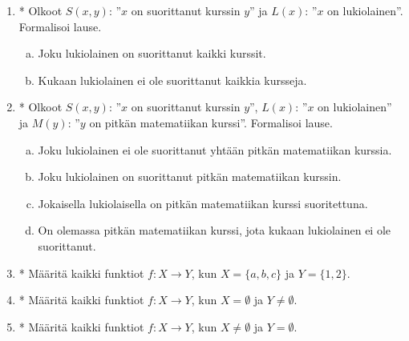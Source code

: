 \begin{enumerate}
\item * %
 Olkoot $S(x, y)$: ''$x$ on suorittanut
kurssin $y$'' ja $L(x)$: ''$x$ on lukiolainen''. Formalisoi lause.
\begin{enumerate}[a)]
\item Joku lukiolainen on suorittanut kaikki kurssit.
\item Kukaan lukiolainen ei ole suorittanut kaikkia kursseja.
\end{enumerate}

\item * %
Olkoot $S(x, y)$: ''$x$ on suorittanut
kurssin $y$'', $L(x)$: ''$x$ on lukiolainen'' ja $M(y)$: ''$y$ on
pitkän matematiikan kurssi''. Formalisoi lause.
\begin{enumerate}[a)]
\item Joku lukiolainen ei ole suorittanut yhtään pitkän
matematiikan kurssia.
\item Joku lukiolainen on suorittanut pitkän matematiikan
kurssin.
\item Jokaisella lukiolaisella on pitkän matematiikan kurssi
suoritettuna.
\item On olemassa pitkän matematiikan kurssi, jota kukaan
lukiolainen ei ole suorittanut.
\end{enumerate}

\item * %
Määritä kaikki funktiot $f\colon X\to Y$,
kun $X=\{a, b, c\}$ ja $Y=\{1, 2\}$.

\item * %
Määritä kaikki funktiot $f\colon X\to Y$,
kun $X=\emptyset$ ja $Y\neq \emptyset$.

\item * %
Määritä kaikki funktiot $f\colon X\to Y$,
kun $X\neq \emptyset$ ja $Y= \emptyset$.

%

\end{enumerate}
